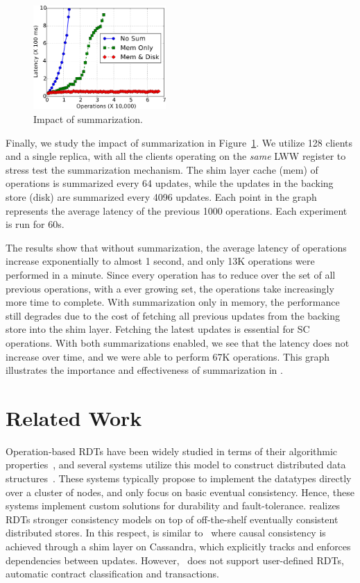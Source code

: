 \begin{figure}[t]
\centering
\includegraphics[width=0.45\textwidth]{graphs/summarization.pdf}
\caption{Impact of summarization.}
\label{grf:summarization}
\end{figure}

Finally, we study the impact of summarization in
Figure~\ref{grf:summarization}. We utilize 128 clients and a single \quelea
replica, with all the clients operating on the \emph{same} LWW register to
stress test the summarization mechanism. The shim layer cache (mem) of
operations is summarized every 64 updates, while the updates in the backing
store (disk) are summarized every 4096 updates. Each point in the graph
represents the average latency of the previous 1000 operations. Each experiment
is run for 60s.

The results show that without summarization, the average latency of operations
increase exponentially to almost 1 second, and only 13K operations were
performed in a minute. Since every operation has to reduce over the set of all
previous operations, with a ever growing set, the operations take increasingly
more time to complete. With summarization only in memory, the performance still
degrades due to the cost of fetching all previous updates from the backing
store into the shim layer. Fetching the latest updates is essential for SC
operations. With both summarizations enabled, we see that the latency does not
increase over time, and we were able to perform 67K operations. This graph
illustrates the importance and effectiveness of summarization in \quelea.

\section{Related Work}
\label{q_sec:related}

Operation-based RDTs have been widely studied in terms of their algorithmic
properties~\cite{SSS,Burckhardt2014}, and several systems utilize this model to
construct distributed data structures~\cite{Lakshman2010,Bayou,Tango}. These
systems typically propose to implement the datatypes directly over a cluster of
nodes, and only focus on basic eventual consistency. Hence, these systems
implement custom solutions for durability and fault-tolerance. \quelea realizes
RDTs stronger consistency models on top of off-the-shelf eventually consistent
distributed stores. In this respect, \quelea is similar to~\cite{BoltOn} where
causal consistency is achieved through a shim layer on Cassandra, which
explicitly tracks and enforces dependencies between updates.
However,~\cite{BoltOn} does not support user-defined RDTs, automatic contract
classification and transactions.

